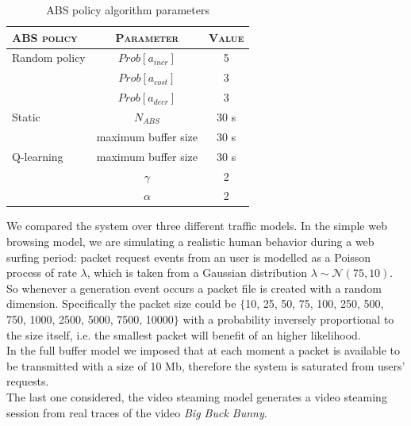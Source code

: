 \documentclass[conference,10pt]{IEEEtran}
\begin{document}
\bgroup
\def\arraystretch{1.2}%
\begin{footnotesize}
	\begin{table}[!htb]
		\centering
		\vspace{10pt}
		\caption{ABS policy algorithm parameters}\label{table:a}
		\begin{tabular}{lcc} 
			\hline
			\multicolumn{1}{l|}{\scshape ABS policy} & \multicolumn{1}{c}{\scshape Parameter}   	& \scshape Value    \\ \hline
			\multicolumn{1}{l|}{Random policy}       & \multicolumn{1}{c|}{$Prob[a_{incr}]$} 		& 5                 \\ 
			\multicolumn{1}{l|}{}                   	& \multicolumn{1}{c|}{$Prob[a_{cost}]$} 			& 3\\
			\multicolumn{1}{l|}{}                   	& \multicolumn{1}{c|}{$Prob[a_{decr}]$} 		& 3       \\ \hline
			\multicolumn{1}{l|}{Static}				& \multicolumn{1}{c|}{$N_{ABS}$} 	 			& 30 s		     \\  \hline   
			\multicolumn{1}{l|}{}					& \multicolumn{1}{c|}{maximum buffer size} 	 & 30 s		     \\           
			\multicolumn{1}{l|}{Q-learning}			& \multicolumn{1}{c|}{maximum buffer size} 	 & 30 s		     \\   
			\multicolumn{1}{l|}{}                   	& \multicolumn{1}{c|}{$\gamma$}                  & 2                 \\ 
			\multicolumn{1}{l|}{}                   	& \multicolumn{1}{c|}{$\alpha$}                  & 2                 \\              
		\end{tabular}
	\end{table}
\end{footnotesize}
\egroup
\noindent We compared the system over three different traffic models. In the simple web browsing model, we are simulating a realistic human behavior during a web surfing period: packet request events from an user is modelled as a Poisson process of rate $\lambda$, which is taken from a Gaussian distribution $\lambda\sim\mathcal{N}(75, 10)$. So whenever a generation event occurs a packet file is created with a random dimension. Specifically the packet size could be $\lbrace$10, 25, 50, 75, 100, 250, 500, 750, 1000, 2500, 5000, 7500, 10000$\rbrace$ with a probability inversely proportional to the size itself, i.e. the smallest packet will benefit of an higher likelihood.\\
In the full buffer model we imposed that at each moment a packet is available to be transmitted with a size of 10 Mb, therefore the system is saturated from users' requests.\\
The last one considered, the video steaming model generates a video steaming session from real traces of the video \textit{Big Buck Bunny}.
\end{document}
